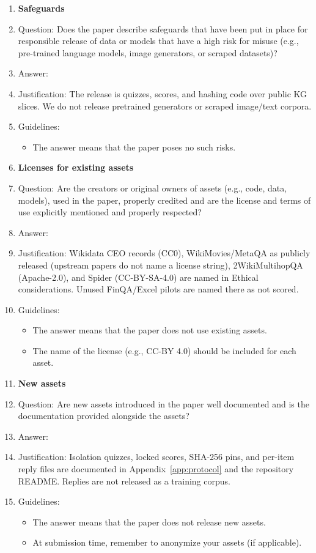 \begin{enumerate}
\item {\bf Safeguards}
\item[] Question: Does the paper describe safeguards that have been put in place for responsible release of data or models that have a high risk for misuse (e.g., pre-trained language models, image generators, or scraped datasets)?
\item[] Answer: \answerNA{}
\item[] Justification: The release is quizzes, scores, and hashing code over public KG slices. We do not release pretrained generators or scraped image/text corpora.
\item[] Guidelines:
\begin{itemize}
\item The answer \answerNA{} means that the paper poses no such risks.
\end{itemize}

\item {\bf Licenses for existing assets}
\item[] Question: Are the creators or original owners of assets (e.g., code, data, models), used in the paper, properly credited and are the license and terms of use explicitly mentioned and properly respected?
\item[] Answer: \answerYes{}
\item[] Justification: Wikidata CEO records (CC0), WikiMovies/MetaQA as publicly released (upstream papers do not name a license string), 2WikiMultihopQA (Apache-2.0), and Spider (CC-BY-SA-4.0) are named in Ethical considerations. Unused FinQA/Excel pilots are named there as not scored.
\item[] Guidelines:
\begin{itemize}
\item The answer \answerNA{} means that the paper does not use existing assets.
\item The name of the license (e.g., CC-BY 4.0) should be included for each asset.
\end{itemize}

\item {\bf New assets}
\item[] Question: Are new assets introduced in the paper well documented and is the documentation provided alongside the assets?
\item[] Answer: \answerYes{}
\item[] Justification: Isolation quizzes, locked scores, SHA-256 pins, and per-item reply files are documented in Appendix~\ref{app:protocol} and the repository README. Replies are not released as a training corpus.
\item[] Guidelines:
\begin{itemize}
\item The answer \answerNA{} means that the paper does not release new assets.
\item At submission time, remember to anonymize your assets (if applicable).
\end{itemize}


\end{enumerate}
